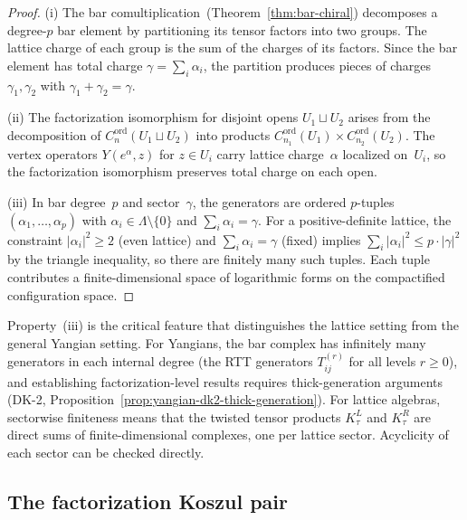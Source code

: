 \begin{proof}
(i) The bar comultiplication~(Theorem~\ref{thm:bar-chiral})
decomposes a degree-$p$ bar element by partitioning its tensor
factors into two groups.  The lattice charge of each group is the
sum of the charges of its factors.  Since the bar element has total
charge $\gamma = \sum_i \alpha_i$, the partition produces pieces of
charges $\gamma_1, \gamma_2$ with $\gamma_1 + \gamma_2 = \gamma$.

(ii) The factorization isomorphism for disjoint opens
$U_1 \sqcup U_2$ arises from the decomposition of
$C^{\mathrm{ord}}_n(U_1 \sqcup U_2)$ into products
$C^{\mathrm{ord}}_{n_1}(U_1) \times C^{\mathrm{ord}}_{n_2}(U_2)$.
The vertex operators $Y(e^\alpha, z)$ for $z \in U_i$ carry lattice
charge~$\alpha$ localized on~$U_i$, so the factorization
isomorphism preserves total charge on each open.

(iii) In bar degree~$p$ and sector~$\gamma$, the generators are
ordered $p$-tuples $(\alpha_1, \ldots, \alpha_p)$ with
$\alpha_i \in \Lambda \setminus \{0\}$ and
$\sum_i \alpha_i = \gamma$.  For a positive-definite lattice, the
constraint $|\alpha_i|^2 \geq 2$ (even lattice) and
$\sum_i \alpha_i = \gamma$ (fixed) implies
$\sum_i |\alpha_i|^2 \leq p \cdot |\gamma|^2$ by the triangle
inequality, so there are finitely many such tuples.  Each tuple
contributes a finite-dimensional space of logarithmic forms on the
compactified configuration space.
\end{proof}

\begin{remark}
\label{rem:lattice:sectorwise-finiteness}
Property~(iii) is the critical feature that distinguishes the lattice
setting from the general Yangian setting.  For Yangians, the bar
complex has infinitely many generators in each internal degree (the
RTT generators $T_{ij}^{(r)}$ for all levels $r \geq 0$), and
establishing factorization-level results requires thick-generation
arguments (DK-2, Proposition~\ref{prop:yangian-dk2-thick-generation}).
For lattice algebras, sectorwise finiteness means that the twisted
tensor products $K_\tau^L$ and $K_\tau^R$ are direct sums of
finite-dimensional complexes, one per lattice sector.  Acyclicity
of each sector can be checked directly.
\end{remark}

\subsection{The factorization Koszul pair}

